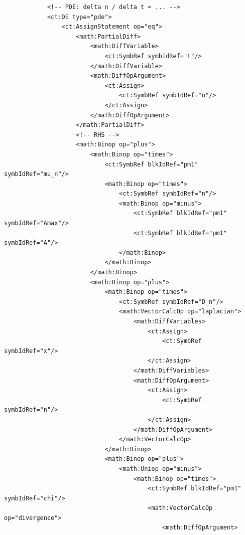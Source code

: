 \lstset{language=XML}
\begin{lstlisting}
            <!-- PDE: delta n / delta t = ... -->
            <ct:DE type="pde">
                <ct:AssignStatement op="eq">
                    <math:PartialDiff>
                        <math:DiffVariable>
                            <ct:SymbRef symbIdRef="t"/>
                        </math:DiffVariable>
                        <math:DiffOpArgument>
                            <ct:Assign>
                                <ct:SymbRef symbIdRef="n"/>
                            </ct:Assign>
                        </math:DiffOpArgument>
                    </math:PartialDiff>
                    <!-- RHS -->
                    <math:Binop op="plus">
                        <math:Binop op="times">
                            <ct:SymbRef blkIdRef="pm1" symbIdRef="mu_n"/>
                            <math:Binop op="times">
                                <ct:SymbRef symbIdRef="n"/>
                                <math:Binop op="minus">
                                    <ct:SymbRef blkIdRef="pm1" symbIdRef="Amax"/>
                                    <ct:SymbRef blkIdRef="pm1" symbIdRef="A"/>
                                </math:Binop>
                            </math:Binop>
                        </math:Binop>
                        <math:Binop op="plus">
                            <math:Binop op="times">
                                <ct:SymbRef symbIdRef="D_n"/>
                                <math:VectorCalcOp op="laplacian">
                                    <math:DiffVariables>
                                        <ct:Assign>
                                            <ct:SymbRef symbIdRef="x"/>
                                        </ct:Assign>
                                    </math:DiffVariables>
                                    <math:DiffOpArgument>
                                        <ct:Assign>
                                            <ct:SymbRef symbIdRef="n"/>
                                        </ct:Assign>
                                    </math:DiffOpArgument>
                                </math:VectorCalcOp>
                            </math:Binop>
                            <math:Binop op="plus">
                                <math:Uniop op="minus">
                                    <math:Binop op="times">
                                        <ct:SymbRef blkIdRef="pm1" symbIdRef="chi"/>
                                        <math:VectorCalcOp op="divergence">
                                            <math:DiffOpArgument>

\end{lstlisting}
